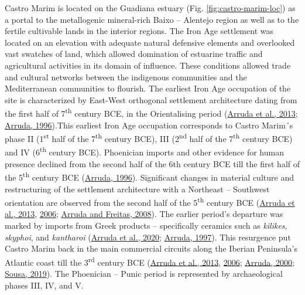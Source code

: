 \documentclass[preprint, 3p, authoryear]{elsarticle} %
\begin{document}
Castro Marim is located on the Guadiana estuary (Fig. \ref{fig:castro-marim-loc}) as a portal to the metallogenic mineral-rich Baixo -- Alentejo region as well as to the fertile cultivable lands in the interior regions. The Iron Age settlement was located on an elevation with adequate natural defensive elements and overlooked vast swatches of land, which allowed domination of estuarine traffic and agricultural activities in its domain of influence. These conditions allowed trade and cultural networks between the indigenous communities and the Mediterranean communities to flourish. The earliest Iron Age occupation of the site is characterized by East-West orthogonal settlement architecture dating from the first half of 7\textsuperscript{th} century BCE, in the Orientalising period (\protect\hyperlink{ref-arruda_etal13}{Arruda et al., 2013}; \protect\hyperlink{ref-arruda96}{Arruda, 1996}).This earliest Iron Age occupation corresponds to Castro Marim´s phase II (1\textsuperscript{st} half of the 7\textsuperscript{th} century BCE), III (2\textsuperscript{nd} half of the 7\textsuperscript{th} century BCE) and IV (6\textsuperscript{th} century BCE). Phoenician imports and other evidence for human presence declined from the second half of the 6th century BCE till the first half of the 5\textsuperscript{th} century BCE (\protect\hyperlink{ref-arruda96}{Arruda, 1996}). Significant changes in material culture and restructuring of the settlement architecture with a Northeast -- Southwest orientation are observed from the second half of the 5\textsuperscript{th} century BCE (\protect\hyperlink{ref-arruda_etal13}{Arruda et al., 2013}, \protect\hyperlink{ref-arruda_etal06}{2006}; \protect\hyperlink{ref-arruda_freitas08}{Arruda and Freitas, 2008}). The earlier period's departure was marked by imports from Greek products -- specifically ceramics such as \emph{kilikes}, \emph{skyphoi}, and \emph{kantharoi} (\protect\hyperlink{ref-arruda_etal20}{Arruda et al., 2020}; \protect\hyperlink{ref-arruda97}{Arruda, 1997}). This resurgence put Castro Marim back in the main commercial circuits along the Iberian Peninsula's Atlantic coast till the 3\textsuperscript{rd} century BCE (\protect\hyperlink{ref-arruda_etal13}{Arruda et al., 2013}, \protect\hyperlink{ref-arruda_etal06}{2006}; \protect\hyperlink{ref-arruda00}{Arruda, 2000}; \protect\hyperlink{ref-sousa19}{Sousa, 2019}). The Phoenician -- Punic period is represented by archaeological phases III, IV, and V.
\end{document}
